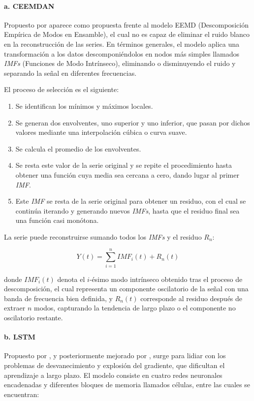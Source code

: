\documentclass[12pt]{paper}
\begin{document}
\paragraph{a. CEEMDAN}
Propuesto por \cite{torres2011ceemdan} aparece como propuesta frente al modelo EEMD (Descomposición Empírica de Modos en Ensamble), el cual no es capaz de eliminar el ruido blanco en la reconstrucción de las series. En términos generales, el modelo aplica una transformación a los datos descomponiéndolos en nodos más simples llamados \textit{IMFs} (Funciones de Modo Intrínseco), eliminando o disminuyendo el ruido y separando la señal en diferentes frecuencias.

El proceso de selección es el siguiente:
\begin{enumerate}
    \item Se identifican los mínimos y máximos locales.
    \item Se generan dos envolventes, uno superior y uno inferior, que pasan por dichos valores mediante una interpolación cúbica o curva suave.
    \item Se calcula el promedio de los envolventes.
    \item Se resta este valor de la serie original y se repite el procedimiento hasta obtener una función cuya media sea cercana a cero, dando lugar al primer \textit{IMF}.
    \item Este \textit{IMF} se resta de la serie original para obtener un residuo, con el cual se continúa iterando y generando nuevos \textit{IMFs}, hasta que el residuo final sea una función casi monótona.
\end{enumerate}

La serie puede reconstruirse sumando todos los \textit{IMFs} y el residuo $R_n$:

\begin{equation}
 Y(t) = \sum_{i=1}^{n} IMF_i(t) + R_n(t)
\end{equation}

donde $IMF_i(t)$ denota el $i$-ésimo modo intrínseco obtenido tras el proceso de descomposición, el cual representa un componente oscilatorio de la señal con una banda de frecuencia bien definida, y $R_n(t)$ corresponde al residuo después de extraer $n$ modos, capturando la tendencia de largo plazo o el componente no oscilatorio restante.

\paragraph{b. LSTM}
Propuesto por \cite{hochreiter1997lstm}, y posteriormente mejorado por \cite{graves2006ctc}, surge para lidiar con los problemas de desvanecimiento y explosión del gradiente, que dificultan el aprendizaje a largo plazo. El modelo consiste en cuatro redes neuronales encadenadas y diferentes bloques de memoria llamados células, entre las cuales se encuentran:
\end{document}
